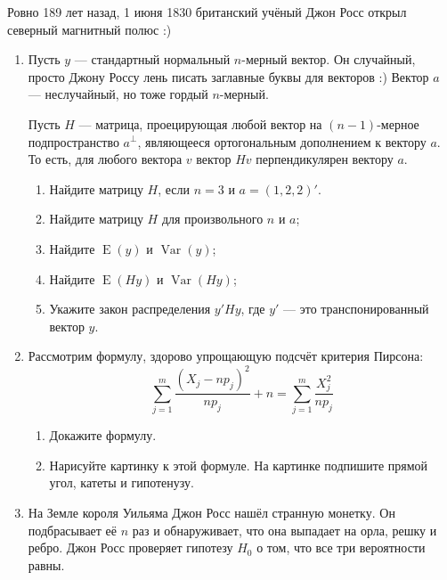 \documentclass[12pt]{article}
\DeclareMathOperator{\Var}{Var}
\DeclareMathOperator{\E}{E}
\begin{document}

Ровно 189 лет назад, 1 июня 1830 британский учёный Джон Росс открыл северный магнитный полюс :)


\begin{enumerate}
\item Пусть $y$ — стандартный нормальный $n$-мерный вектор. 
Он случайный, просто Джону Россу лень писать заглавные буквы для векторов :) 
Вектор $a$ — неслучайный, но тоже гордый $n$-мерный.

Пусть $H$ — матрица, проецирующая любой вектор на $(n-1)$-мерное подпространство $a^{\perp}$, 
являющееся ортогональным дополнением к вектору $a$. 
То есть, для любого вектора $v$ вектор $Hv$ перпендикулярен вектору $a$.

\begin{enumerate}
    \item Найдите матрицу $H$, если $n=3$ и $a=(1,2,2)'$.
    \item Найдите матрицу $H$ для произвольного $n$ и $a$;
    \item Найдите $\E(y)$ и $\Var(y)$;
    \item Найдите $\E(Hy)$ и $\Var(Hy)$;
    \item Укажите закон распределения $y'Hy$, где $y'$ — это транспонированный вектор $y$.
\end{enumerate}

\item Рассмотрим формулу, здорово упрощающую подсчёт критерия Пирсона:
\[
 \sum_{j=1}^m \frac{(X_j - np_j)^2}{np_j} + n = \sum_{j=1}^m \frac{X_j^2}{np_j}
\]

\begin{enumerate}
    \item Докажите формулу.
    \item Нарисуйте картинку к этой формуле. На картинке подпишите прямой угол, катеты и гипотенузу.
\end{enumerate}


\item На Земле короля Уильяма Джон Росс нашёл странную монетку. 
Он подбрасывает её $n$ раз и обнаруживает, что она выпадает на орла, решку и ребро. 
Джон Росс проверяет гипотезу $H_0$ о том, что все три вероятности равны.


\end{enumerate}
\end{document}

